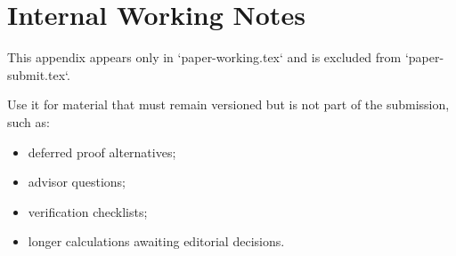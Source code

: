 \section{Internal Working Notes}
\label{app:internal-notes}

This appendix appears only in `paper-working.tex` and is excluded from
`paper-submit.tex`.

Use it for material that must remain versioned but is not part of the
submission, such as:

\begin{itemize}
  \item deferred proof alternatives;
  \item advisor questions;
  \item verification checklists;
  \item longer calculations awaiting editorial decisions.
\end{itemize}
